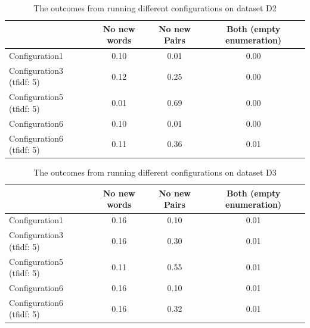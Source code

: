 \begin{center}
\begin{table}
  \begin{tabular}{|l|c|c|c|}
    \hline
    &  No new words & No new Pairs & Both (empty enumeration) \\ \hline
    Configuration1                    & 0.10  & 0.01  & 0.00 \\ \hline
    Configuration3 (tfidf: 5)         & 0.12  & 0.25  & 0.00 \\ \hline
    Configuration5 (tfidf: 5)         & 0.01  & 0.69  & 0.00 \\ \hline
    Configuration6                    & 0.10  & 0.01  & 0.00 \\ \hline
    Configuration6 (tfidf: 5)         & 0.11  & 0.36  & 0.01 \\ \hline
  \end{tabular}
  \caption{The outcomes from running different configurations on dataset D2}
  \label{tab:d2}
\end{table}
\end{center}

\begin{center}
\begin{table}
  \begin{tabular}{|l|c|c|c|}
    \hline
    &  No new words & No new Pairs & Both (empty enumeration) \\ \hline
    Configuration1                    & 0.16  & 0.10  & 0.01 \\ \hline
    Configuration3 (tfidf: 5)         & 0.16  & 0.30  & 0.01 \\ \hline
    Configuration5 (tfidf: 5)         & 0.11  & 0.55  & 0.01 \\ \hline
    Configuration6                    & 0.16  & 0.10  & 0.01 \\ \hline
    Configuration6 (tfidf: 5)         & 0.16  & 0.32  & 0.01 \\ \hline
  \end{tabular}
  \caption{The outcomes from running different configurations on dataset D3}
  \label{tab:d3}
\end{table}
\end{center}

